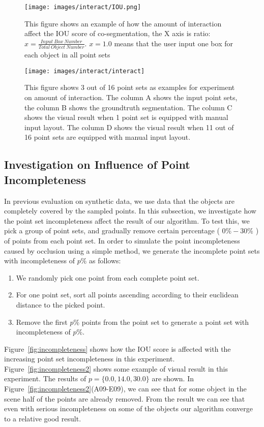 \begin{figure}
	\centering
	\texttt{[image: images/interact/IOU.png]}
	\caption{This figure shows an example of how the amount of interaction affect the IOU score of co-segmentation, the X axis is ratio: $x=\frac{Input~Box~Number}{Total~Object~Number}$. $x=1.0$ means that the user input one box for each object in all point sets}
	\label{fig:interact_number}
\end{figure}

\begin{figure}
	\centering
	\texttt{[image: images/interact/interact]}
	\caption{This figure shows 3 out of 16 point sets as examples for experiment on amount of interaction. The column A shows the input point sets, the column B shows the groundtruth segmentation. The column C shows the visual result when 1 point set is equipped with manual input layout. The column D shows the visual result when 11 out of 16 point sets are equipped with manual input layout.
	}
	\label{fig:interact_vis}
\end{figure}

\subsection{Investigation on Influence of Point Incompleteness}
\label{sec:exp-incompleteness}
In previous evaluation on synthetic data, we use data that the objects are completely covered by the sampled points. 
%
In this subsection, we investigate how the point set incompleteness affect the result of our algorithm. 
%
To test this, we pick a group of point sets, and gradually remove certain percentage ( $0\%-30\%$ ) of points from each point set. In order to simulate the point incompleteness caused by occlusion using a simple method, we generate the incomplete point sets with incompleteness of $p\%$ as follows:
\begin{enumerate}
	\item We randomly pick one point from each complete point set. 
	\item For one point set, sort all points ascending according to their euclidean distance to the picked point.  
	\item Remove the first $p\%$ points from the point set to generate a point set with incompleteness of $p\%$.
\end{enumerate}
% 
Figure~\ref{fig:incompleteness} shows how the IOU score is affected with the increasing point set incompleteness in this experiment. 
Figure~\ref{fig:incompleteness2} shows some example of visual result in this experiment. The results of $p=\{0.0,14.0,30.0\}$ are shown. In Figure~\ref{fig:incompleteness2}(A09-E09), we can see that for some object in the scene half of the points are already removed. From the result we can see that even with serious incompleteness on some of the objects our algorithm converge to a relative good result.

